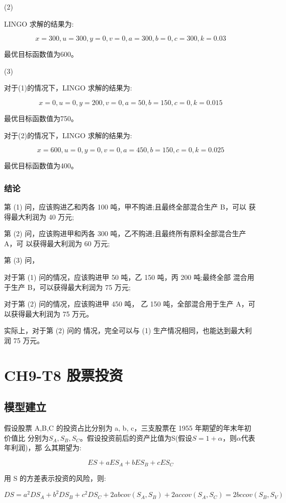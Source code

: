 \documentclass{article}
\begin{document}
(2)

LINGO 求解的结果为:

$$x=300,u=300,y=0,v=0,a=300,b=0,c=300,k=0.03$$

最优目标函数值为600。


(3)

对于(1)的情况下，LINGO 求解的结果为:

$$x=0,u=0,y=200,v=0,a=50,b=150,c=0,k=0.015$$

最优目标函数值为750。

对于(2)的情况下，LINGO 求解的结果为:

$$x=600,u=0,y=0,v=0,a=450,b=150,c=0,k=0.025$$

最优目标函数值为400。


\subsubsection{结论}

第 (1) 问，应该购进乙和丙各 100 吨，甲不购进;且最终全部混合生产 B，可以 获得最大利润为 40 万元;


第 (2) 问，应该购进甲和丙各 300 吨，乙不购进;且最终所有原料全部混合生产 A，可 以获得最大利润为 60 万元;


第 (3) 问，

对于第 (1) 问的情况，应该购进甲 50 吨，乙 150 吨，丙 200 吨;最终全部 混合用于生产 B，可以获得最大利润为 75 万元;

对于第 (2) 问的情况，应该购进甲 450 吨， 乙 150 吨，全部混合用于生产 A，可以获得最大利润为 75 万元。

实际上，对于第 (2) 问的 情况，完全可以与 (1) 生产情况相同，也能达到最大利润 75 万元。



\section{CH9-T8 股票投资}

\subsection{模型建立}
假设股票 A,B,C 的投资占比分别为 a, b, c，三支股票在 1955 年期望的年末年初价值比 分别为$S_A,S_B,S_C$。假设投资前后的资产比值为S(假设$S = 1+\alpha$，则$\alpha$代表年利润)，那 么其期望为:

$$ES+aES_A+bES_B+cES_C$$

用 S 的方差表示投资的风险，则:

$$DS=a^2DS_A+b^2DS_B+c^2DS_C+2abcov(S_A,S_B)+2accov(S_A,S_C)=2bccov(S_B,S_V)$$
\end{document}
